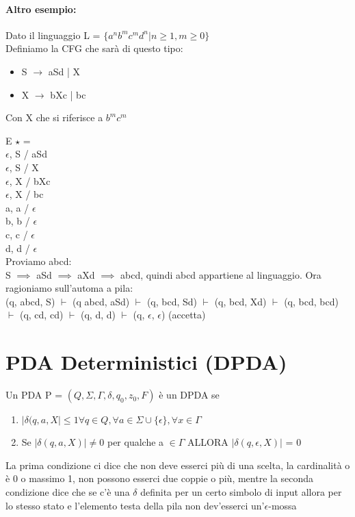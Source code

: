 \documentclass[12pt, a4paper, openany, oneside]{book}
\begin{document}
\paragraph{Altro esempio: }Dato il linguaggio L = 
$\{a^{n}b^{m}c^{m}d^{n} | n \geq 1, m \geq 0\}$\\
Definiamo la CFG che sarà di questo tipo: 
\begin{itemize}
	\item S $\to$ aSd | X
	\item X $\to$ bXc | bc
\end{itemize}
Con X che si riferisce a $b^{m}c^{m}$ 
\begin{center}
\end{center}
E $\star$ = \\
$\epsilon$, S / aSd \\
$\epsilon$, S / X \\
$\epsilon$, X / bXc \\
$\epsilon$, X / bc \\
a, a / $\epsilon$ \\
b, b / $\epsilon$ \\
c, c / $\epsilon$ \\
d, d / $\epsilon$ \\
Proviamo abcd:\\
S $\implies$ aSd $\implies$ aXd $\implies$ abcd, quindi abcd appartiene al 
linguaggio. Ora ragioniamo sull'automa a pila:\\
(q, abcd, S) $\vdash$ (q abcd, aSd) $\vdash$ (q, bcd, Sd) $\vdash$ (q, bcd, Xd)
$\vdash$ (q, bcd, bcd) $\vdash$ (q, cd, cd) $\vdash$ (q, d, d) $\vdash$
(q, $\epsilon$, $\epsilon$) (accetta)
\section{PDA Deterministici (DPDA)}
Un PDA P = $(Q, \Sigma, \Gamma, \delta, q_{0}, z_{0}, F)$ è un DPDA se
\begin{enumerate}
	\item $|\delta(q,a,X| \leq 1 \forall q \in Q, \forall a \in \Sigma \cup 
	\{\epsilon\}, \forall x \in \Gamma$
	\item Se $|\delta(q, a, X)| \neq 0$ per qualche a $\in \Gamma$ ALLORA 
	$|\delta(q, \epsilon, X)|$ = 0
\end{enumerate}
La prima condizione ci dice che non deve esserci più di una scelta, la cardinalità
o è 0 o massimo 1, non possono esserci due coppie o più, mentre la seconda 
condizione dice che se c'è una $\delta$ definita per un certo simbolo di input
allora per lo stesso stato e l'elemento testa della pila non dev'esserci 
un'$\epsilon$-mossa
\end{document}
